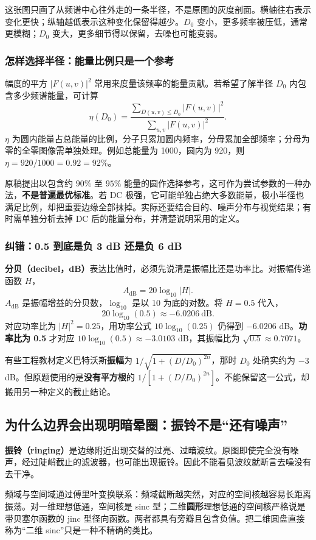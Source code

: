 这张图只画了从频谱中心往外走的一条半径，不是原图的灰度剖面。横轴往右表示变化更快；纵轴越低表示这种变化保留得越少。$D_0$ 变小，更多频率被压低，通常更模糊；$D_0$ 变大，更多细节得以保留，去噪也可能变弱。

\subsubsection{怎样选择半径：能量比例只是一个参考}
幅度的平方 $|F(u,v)|^2$ 常用来度量该频率的能量贡献。若希望了解半径 $D_0$ 内包含多少频谱能量，可计算
\[
\eta(D_0)=\frac{\displaystyle\sum_{D(u,v)\leq D_0}|F(u,v)|^2}
{\displaystyle\sum_{u,v}|F(u,v)|^2}.
\]
$\eta$ 为圆内能量占总能量的比例，分子只累加圆内频率，分母累加全部频率；分母为零的全零图像需单独处理。例如总能量为 1000，圆内为 920，则 $\eta=920/1000=0.92=92\%$。

原稿提出以包含约 $90\%$ 至 $95\%$ 能量的圆作选择参考，这可作为尝试参数的一种办法，\textbf{不是普遍最优标准}。若 DC 极强，它可能单独占绝大多数能量，极小半径也满足比例，却把重要边缘全部抹掉。实际还要结合目的、噪声分布与视觉结果；有时需单独分析去掉 DC 后的能量分布，并清楚说明采用的定义。

\subsubsection{纠错：0.5 到底是负 3 dB 还是负 6 dB}
\textbf{分贝（decibel，dB）}表达比值时，必须先说清是振幅比还是功率比。对振幅传递函数 $H$，
\[
A_{\mathrm{dB}}=20\log_{10}|H|.
\]
$A_{\mathrm{dB}}$ 是振幅增益的分贝数，$\log_{10}$ 是以 10 为底的对数。将 $H=0.5$ 代入，
\[
20\log_{10}(0.5)\approx-6.0206\ \mathrm{dB}.
\]
对应功率比为 $|H|^2=0.25$，用功率公式 $10\log_{10}(0.25)$ 仍得到 $-6.0206$ dB。\textbf{功率比为 0.5} 才对应 $10\log_{10}(0.5)\approx-3.0103$ dB，其振幅比为 $\sqrt{0.5}\approx0.7071$。

有些工程教材定义巴特沃斯\textbf{振幅}为 $1/\sqrt{1+(D/D_0)^{2n}}$，那时 $D_0$ 处确实约为 $-3$ dB。但原题使用的是\textbf{没有平方根}的 $1/[1+(D/D_0)^{2n}]$。不能保留这一公式，却搬用另一种定义的截止结论。

\subsection{为什么边界会出现明暗晕圈：振铃不是“还有噪声”}

\textbf{振铃（ringing）}是边缘附近出现交替的过亮、过暗波纹。原图即使完全没有噪声，经过陡峭截止的滤波器，也可能出现振铃。因此不能看见波纹就断言去噪没有去干净。

频域与空间域通过傅里叶变换联系：频域截断越突然，对应的空间核越容易长距离振荡。对一维理想低通，空间核是 sinc 型；二维\textbf{圆形}理想低通的空间核严格说是带贝塞尔函数的 jinc 型径向函数。两者都具有旁瓣且包含负值。把二维圆盘直接称为“二维 sinc”只是一种不精确的类比。

